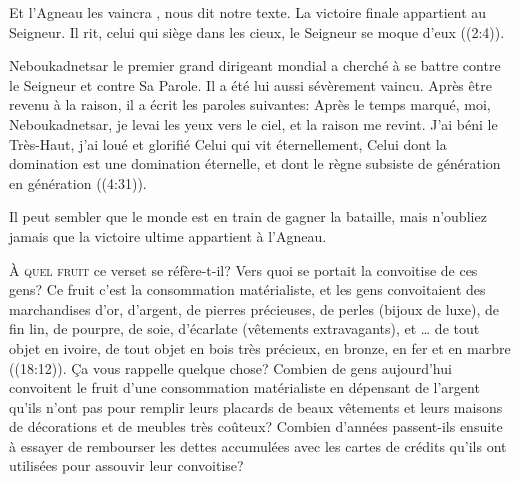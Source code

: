 \Og Et l'Agneau les vaincra \Fg{}, 
 nous dit notre texte. La victoire finale appartient au Seigneur.
 \Og Il rit, celui qui siège dans les cieux, le Seigneur se moque d'eux \Fg{}
 ((2:4)).


Neboukadnetsar \ocadr le premier grand dirigeant mondial \fcadr{}
 a cherché à se battre contre le Seigneur et contre Sa Parole.
 Il a été lui aussi sévèrement vaincu. Après être revenu à la raison,
 il a écrit les paroles suivantes:
 \Og Après le temps marqué, moi, Neboukadnetsar,
 je levai les yeux vers le ciel, et la raison me revint.
 J'ai béni le Très-Haut, j'ai loué et glorifié Celui qui vit éternellement,
 Celui dont la domination est une domination éternelle,
 et dont le règne subsiste de génération en génération \Fg{}
 ((4:31)).

Il peut sembler que le monde est en train de gagner la bataille,
 mais n'oubliez jamais que la victoire ultime appartient à l'Agneau.

\dvrule






\lettrine{À}{ quel fruit} ce verset se réfère-t-il?
 Vers quoi se portait la convoitise de ces gens?
 Ce fruit c'est la consommation matérialiste, et les gens convoitaient
 \Og des marchandises d'or, d'argent, de pierres précieuses, de perles \Fg{}
 (bijoux de luxe), \Og de fin lin, de pourpre, de soie, d'écarlate \Fg{}
 (vêtements extravagants), et \Og \dots{} de tout objet en ivoire,
 de tout objet en bois très précieux, en bronze, en fer et en marbre \Fg{}
 ((18:12)).
 Ça vous rappelle quelque chose? Combien de gens aujourd'hui convoitent
 le fruit d'une consommation matérialiste en dépensant de l'argent
 qu'ils n'ont pas pour remplir leurs placards de beaux vêtements
 et leurs maisons de décorations et de meubles très coûteux?
 Combien d'années passent-ils ensuite à essayer de rembourser
 les dettes accumulées avec les cartes de crédits
 qu'ils ont utilisées pour assouvir leur convoitise?

